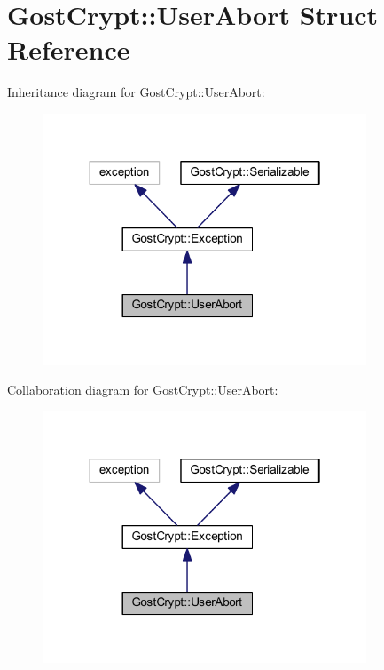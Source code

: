 \hypertarget{struct_gost_crypt_1_1_user_abort}{}\section{Gost\+Crypt\+:\+:User\+Abort Struct Reference}
\label{struct_gost_crypt_1_1_user_abort}


Inheritance diagram for Gost\+Crypt\+:\+:User\+Abort\+:
\nopagebreak
\begin{figure}[H]
\begin{center}
\leavevmode
\includegraphics[width=274pt]{struct_gost_crypt_1_1_user_abort__inherit__graph}
\end{center}
\end{figure}


Collaboration diagram for Gost\+Crypt\+:\+:User\+Abort\+:
\nopagebreak
\begin{figure}[H]
\begin{center}
\leavevmode
\includegraphics[width=274pt]{struct_gost_crypt_1_1_user_abort__coll__graph}
\end{center}
\end{figure}
